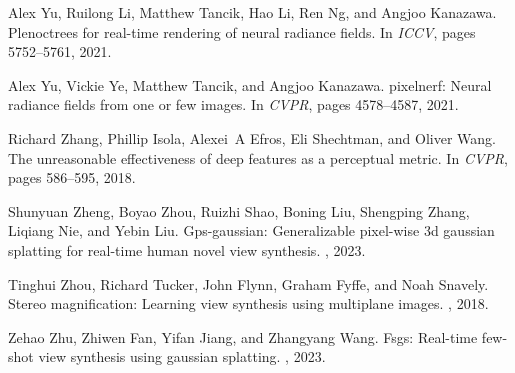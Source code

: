 \documentclass{article}
\begin{document}
{\begin{thebibliography}{10}
Alex Yu, Ruilong Li, Matthew Tancik, Hao Li, Ren Ng, and Angjoo Kanazawa.
\newblock Plenoctrees for real-time rendering of neural radiance fields.
\newblock In {\em ICCV}, pages 5752--5761, 2021.

Alex Yu, Vickie Ye, Matthew Tancik, and Angjoo Kanazawa.
\newblock pixelnerf: Neural radiance fields from one or few images.
\newblock In {\em CVPR}, pages 4578--4587, 2021.

Richard Zhang, Phillip Isola, Alexei~A Efros, Eli Shechtman, and Oliver Wang.
\newblock The unreasonable effectiveness of deep features as a perceptual metric.
\newblock In {\em CVPR}, pages 586--595, 2018.

Shunyuan Zheng, Boyao Zhou, Ruizhi Shao, Boning Liu, Shengping Zhang, Liqiang Nie, and Yebin Liu.
\newblock Gps-gaussian: Generalizable pixel-wise 3d gaussian splatting for real-time human novel view synthesis.
, 2023.

Tinghui Zhou, Richard Tucker, John Flynn, Graham Fyffe, and Noah Snavely.
\newblock Stereo magnification: Learning view synthesis using multiplane images.
, 2018.

Zehao Zhu, Zhiwen Fan, Yifan Jiang, and Zhangyang Wang.
\newblock Fsgs: Real-time few-shot view synthesis using gaussian splatting.
, 2023.

\end{thebibliography}


}


% 

% 

% 
\end{document}
